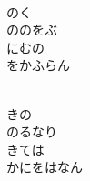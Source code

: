 \documentclass[10pt,b5j]{tarticle} %
\begin{document}
\begin{enumerate}
\begin{minipage}[c]{\blocksize}
        \vspace{\linespace}
        \item~\\
        のく\\
        ののをぶ\\
        にむの\\
        をかふらん
        
        \vspace{\linespace}
        \item~\\
        きの\\
        のるなり\\
        きては\\
        かにをはなん
    
    \end{minipage}
\end{enumerate} %
\end{document}
